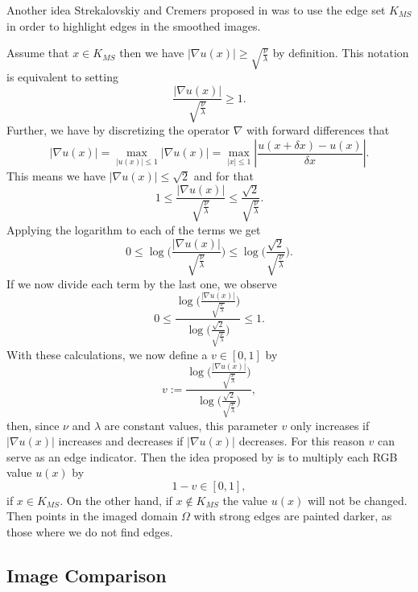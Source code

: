         Another idea Strekalovskiy and Cremers proposed in \cite{Strekalovskiy-Cremers-eccv14} was to use the edge set $K_{MS}$ in order to highlight edges in the smoothed images.

        Assume that $x \in K_{MS}$ then we have $|\nabla u(x)| \ge \sqrt{\frac{\nu}{\lambda}}$ by definition. This notation is equivalent to setting
            $$
                \frac{|\nabla u(x)|}{\sqrt{\frac{\nu}{\lambda}}} \ge 1.
            $$
        Further, we have by discretizing the operator $\nabla$ with forward differences that
            $$
                |\nabla u(x)| = \max_{|u(x)| \le 1} |\nabla u(x)| = \max_{|x| \le 1} |\frac{u(x+\delta x) - u(x)}{\delta x}|.
            $$
        This means we have $|\nabla u(x)| \le \sqrt{2}$ and for that
            $$
                1 \le \frac{|\nabla u(x)|}{\sqrt{\frac{\nu}{\lambda}}} \le \frac{\sqrt{2}}{\sqrt{\frac{\nu}{\lambda}}}.
            $$
        Applying the logarithm to each of the terms we get
            $$
                0 \le \log \bigg( \frac{|\nabla u(x)|}{\sqrt{\frac{\nu}{\lambda}}} \bigg) \le \log \bigg( \frac{\sqrt{2}}{\sqrt{\frac{\nu}{\lambda}}} \bigg).
            $$
        If we now divide each term by the last one, we observe
            $$
                0 \le \frac{\log \bigg( \frac{|\nabla u(x)|}{\sqrt{\frac{\nu}{\lambda}}} \bigg)}{\log \bigg( \frac{\sqrt{2}}{\sqrt{\frac{\nu}{\lambda}}} \bigg)} \le 1.
            $$
        With these calculations, we now define a $v \in [0, 1]$ by
            $$
                v := \frac{\log \bigg( \frac{|\nabla u(x)|}{\sqrt{\frac{\nu}{\lambda}}} \bigg)}{\log \bigg( \frac{\sqrt{2}}{\sqrt{\frac{\nu}{\lambda}}} \bigg)},
            $$
        then, since $\nu$ and $\lambda$ are constant values, this parameter $v$ only increases if $|\nabla u(x)|$ increases and decreases if $|\nabla u(x)|$ decreases. For this reason $v$ can serve as an edge indicator. Then the idea proposed by \cite{Strekalovskiy-Cremers-eccv14} is to multiply each RGB value $u(x)$ by
            $$
                1 - v \in [0, 1],
            $$
        if $x \in K_{MS}$. On the other hand, if $x \notin K_{MS}$ the value $u(x)$ will not be changed. Then points in the imaged domain $\Omega$ with strong edges are painted darker, as those where we do not find edges.


    \subsection{Image Comparison} %
    \label{sub:image_comparison}

